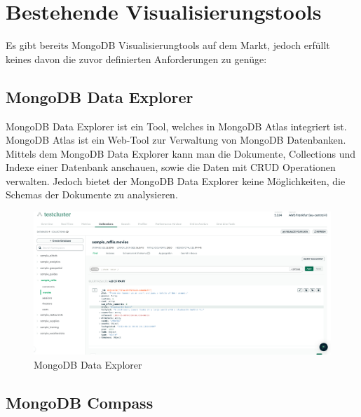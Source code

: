 \section{Bestehende Visualisierungstools}
\label{sec:bestehende_visualisierungstools}

Es gibt bereits MongoDB Visualisierungtools auf dem Markt, jedoch erfüllt keines davon die zuvor definierten Anforderungen zu genüge:
~\autocite{knowi:mongo_vis_tools}

\subsection{MongoDB Data Explorer}
\label{sub:mongodb_data_explorer}

MongoDB Data Explorer ist ein Tool, welches in MongoDB Atlas integriert ist.
MongoDB Atlas ist ein Web-Tool zur Verwaltung von MongoDB Datenbanken.
Mittels dem MongoDB Data Explorer kann man die Dokumente, Collections und Indexe einer Datenbank anschauen, sowie die Daten mit CRUD Operationen verwalten.
Jedoch bietet der MongoDB Data Explorer keine Möglichkeiten, die Schemas der Dokumente zu analysieren.
\begin{figure}[H]
    \includegraphics[width=\textwidth]{images/mongodb_data_explorer}
    \caption{MongoDB Data Explorer}
    \label{fig:mongodb_data_explorer}
\end{figure}

\subsection{MongoDB Compass}
\label{sub:mongodb_compass}

